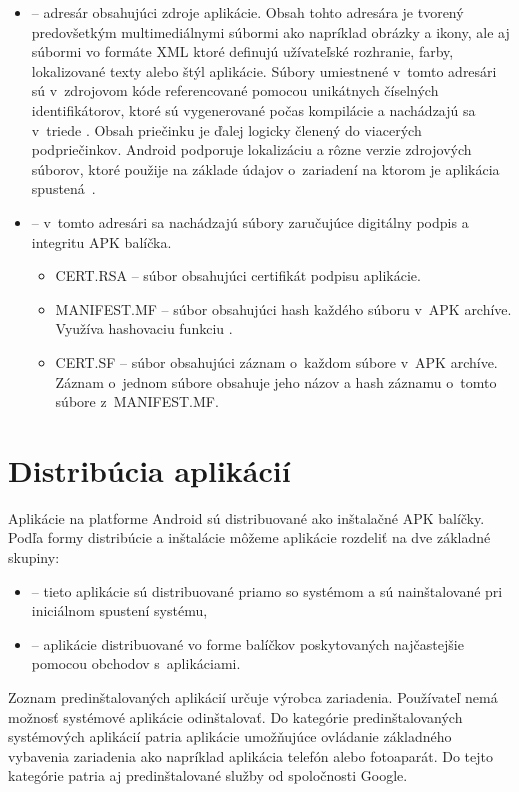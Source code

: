 \begin{itemize}
	\item {} -- adresár obsahujúci zdroje aplikácie. Obsah tohto adresára je tvorený predovšetkým multimediálnymi súbormi ako napríklad obrázky a ikony, ale aj súbormi vo formáte XML ktoré definujú užívateľské rozhranie, farby, lokalizované texty alebo štýl aplikácie. Súbory umiestnené v~tomto adresári sú v~zdrojovom kóde referencované pomocou unikátnych číselných identifikátorov, ktoré sú vygenerované počas kompilácie a nachádzajú sa v~triede . Obsah priečinku je ďalej logicky členený do viacerých podpriečinkov. Android podporuje lokalizáciu a rôzne verzie zdrojových súborov, ktoré použije na základe údajov o~zariadení na ktorom je aplikácia spustená~\cite{Resources}.
	
	\item {} -- v~tomto adresári sa nachádzajú súbory zaručujúce digitálny podpis a integritu APK balíčka. 
		\begin{itemize}
			\item CERT.RSA  -- súbor obsahujúci certifikát podpisu aplikácie.
			\item MANIFEST.MF  -- súbor obsahujúci hash každého súboru v~APK archíve. Využíva hashovaciu funkciu .
			\item CERT.SF  -- súbor obsahujúci záznam o~každom súbore v~APK archíve. Záznam o~jednom súbore obsahuje jeho názov a  hash záznamu o~tomto súbore z~MANIFEST.MF.
		\end{itemize}		
		
		
\end{itemize} 


\section{Distribúcia aplikácií}
Aplikácie na platforme Android sú distribuované ako inštalačné APK balíčky. 
Podľa formy distribúcie a inštalácie môžeme aplikácie rozdeliť na dve základné skupiny:
\begin{itemize}
 \item {} -- tieto aplikácie sú distribuované priamo so systémom a sú nainštalované pri iniciálnom spustení systému,
 \item {} -- aplikácie distribuované vo forme balíčkov poskytovaných najčastejšie pomocou obchodov s~aplikáciami.
\end{itemize}

Zoznam predinštalovaných aplikácií určuje výrobca zariadenia. Používateľ nemá možnosť systémové aplikácie odinštalovať. Do kategórie predinštalovaných systémových aplikácií patria aplikácie umožňujúce ovládanie základného vybavenia zariadenia ako napríklad aplikácia telefón alebo fotoaparát. Do tejto kategórie patria aj predinštalované služby od spoločnosti Google. 

